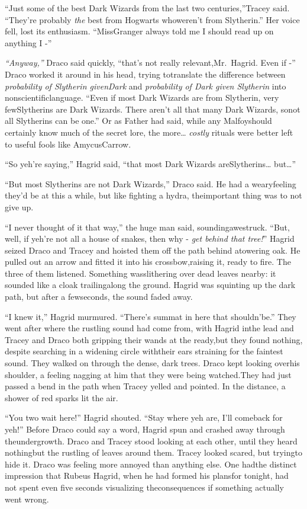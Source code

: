 ``Just some of the best Dark Wizards from the last two centuries,''Tracey said. ``They're probably \emph{the} best from Hogwarts whoweren't from Slytherin.'' Her voice fell, lost its enthusiasm. ``MissGranger always told me I should read up on anything I -''

\emph{``Anyway,''} Draco said quickly, ``that's not really relevant,Mr.~Hagrid. Even if -'' Draco worked it around in his head, trying totranslate the difference between \emph{probability of Slytherin givenDark} and \emph{probability of Dark given Slytherin} into nonscientificlanguage. ``Even if most Dark Wizards are from Slytherin, very fewSlytherins are Dark Wizards. There aren't all that many Dark Wizards, sonot all Slytherins can be one.'' Or as Father had said, while any Malfoyshould certainly know much of the secret lore, the more\ldots{}
\emph{costly} rituals were better left to useful fools like AmycusCarrow.

``So yeh're saying,'' Hagrid said, ``that most Dark Wizards areSlytherins\ldots{} but\ldots{}''

``But most Slytherins are not Dark Wizards,'' Draco said. He had a wearyfeeling they'd be at this a while, but like fighting a hydra, theimportant thing was to not give up.

``I never thought of it that way,'' the huge man said, soundingawestruck. ``But, well, if yeh're not all a house of snakes, then why -
\emph{get behind that tree!}''
Hagrid seized Draco and Tracey and hoisted them off the path behind atowering oak. He pulled out an arrow and fitted it into his crossbow,raising it, ready to fire. The three of them listened. Something wasslithering over dead leaves nearby: it sounded like a cloak trailingalong the ground. Hagrid was squinting up the dark path, but after a fewseconds, the sound faded away.

``I knew it,'' Hagrid murmured. ``There's summat in here that shouldn'be.''
They went after where the rustling sound had come from, with Hagrid inthe lead and Tracey and Draco both gripping their wands at the ready,but they found nothing, despite searching in a widening circle withtheir ears straining for the faintest sound.
They walked on through the dense, dark trees. Draco kept looking overhis shoulder, a feeling nagging at him that they were being watched.They had just passed a bend in the path when Tracey yelled and pointed.
In the distance, a shower of red sparks lit the air.

``You two wait here!'' Hagrid shouted. ``Stay where yeh are, I'll comeback for yeh!''
Before Draco could say a word, Hagrid spun and crashed away through theundergrowth.
Draco and Tracey stood looking at each other, until they heard nothingbut the rustling of leaves around them. Tracey looked scared, but tryingto hide it. Draco was feeling more annoyed than anything else. One hadthe distinct impression that Rubeus Hagrid, when he had formed his plansfor tonight, had not spent even five seconds visualizing theconsequences if something actually went wrong.

